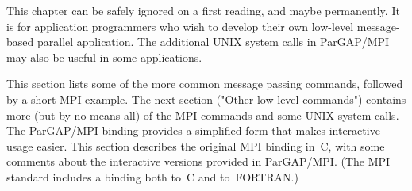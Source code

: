 % 
% 
% 
% 
% 
% 
% 
% 
% 
% 
% 


This chapter can be safely ignored on a first reading, and maybe
permanently.  It is for application programmers who wish to develop
their own low-level message-based parallel application.  The
additional UNIX system calls in ParGAP/MPI may also be useful in some
applications.



This section lists some of the more common message passing commands,
followed by a short MPI example.  The next section ("Other low level
commands") contains more (but by no means all) of the MPI commands and
some UNIX system calls.  The ParGAP/MPI binding provides a simplified form that
makes interactive usage easier.  This section describes the original MPI
binding in~C, with some comments about the interactive versions
provided in ParGAP/MPI.  (The MPI standard includes a binding both
to~C and to~FORTRAN.)

